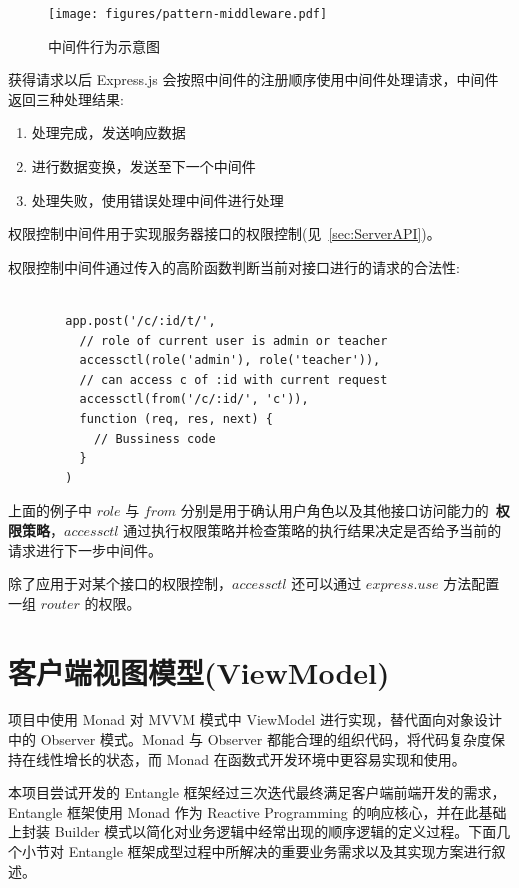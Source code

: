 \begin{figure}[!h]
  \begin{center}
    \texttt{[image: figures/pattern-middleware.pdf]}
    \caption{中间件行为示意图\label{ExpressMiddleware}}
  \end{center}
\end{figure}

获得请求以后 Express.js 会按照中间件的注册顺序使用中间件处理请求，中间件返回三种处理结果:

\begin{enumerate}
  \item 处理完成，发送响应数据
  \item 进行数据变换，发送至下一个中间件
  \item 处理失败，使用错误处理中间件进行处理
\end{enumerate}

权限控制中间件用于实现服务器接口的权限控制(见~\ref{sec:ServerAPI})。

权限控制中间件通过传入的高阶函数判断当前对接口进行的请求的合法性:

\begin{verbatim}

        app.post('/c/:id/t/',
          // role of current user is admin or teacher
          accessctl(role('admin'), role('teacher')),
          // can access c of :id with current request
          accessctl(from('/c/:id/', 'c')),
          function (req, res, next) {
            // Bussiness code
          }
        )

\end{verbatim}

上面的例子中 $role$ 与 $from$ 分别是用于确认用户角色以及其他接口访问能力的~\textbf{权限策略}，$accessctl$ 通过执行权限策略并检查策略的执行结果决定是否给予当前的请求进行下一步中间件。

除了应用于对某个接口的权限控制，$accessctl$ 还可以通过 $express.use$ 方法配置一组 $router$ 的权限。

\section{客户端视图模型(ViewModel)}

项目中使用 Monad 对 MVVM 模式中 ViewModel 进行实现，替代面向对象设计中的 Observer 模式。Monad 与 Observer 都能合理的组织代码，将代码复杂度保持在线性增长的状态，而 Monad 在函数式开发环境中更容易实现和使用。

本项目尝试开发的 Entangle 框架经过三次迭代最终满足客户端前端开发的需求，Entangle 框架使用 Monad 作为 Reactive Programming 的响应核心，并在此基础上封装 Builder 模式以简化对业务逻辑中经常出现的顺序逻辑的定义过程。下面几个小节对 Entangle 框架成型过程中所解决的重要业务需求以及其实现方案进行叙述。

